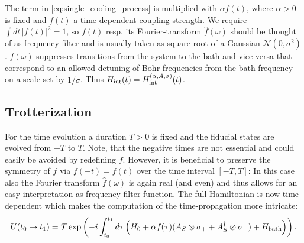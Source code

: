 \documentclass[12pt,a4paper]{article}
\begin{document}
The term in \cref{eq:single_cooling_process} is multiplied with $\alpha f(t)$, where $\alpha >0$ is fixed and $f(t)$ a time-dependent coupling strength. We require $\int dt \, |f(t)|^2  = 1$, so $f(t)$ resp. its Fourier-transform $\hat{f}(\omega)$ should be thought of as frequency filter and is usually taken as square-root of a Gaussian $\mathcal{N}(0,\sigma^2)$. $\hat{f}(\omega)$ suppresses transitions from the system to the bath and vice versa that correspond to an allowed detuning of Bohr-frequencies from the bath frequency on a scale set by $1/\sigma$. Thus $H_{\rm int}(t) =  H_{\rm int}^{(\alpha, A, \sigma)}(t)$. 

\subsection{Trotterization}
For the time evolution a duration $T>0$ is fixed and the fiducial states are evolved from $-T$ to $T$. Note, that the negative times are not essential and could easily be avoided by redefining $f$. However, it is beneficial to preserve the symmetry of $f$ via $f(-t)=f(t)$ over the time interval $[-T,T]$: In this case also the Fourier transform $\hat{f}(\omega)$ is again real (and even) and thus allows for an easy interpretation as frequency filter-function. The full Hamiltonian %
is now time dependent which makes the computation of the time-propagation more intricate:
\begin{align}\label{eq:timedependent_H}
U(t_0 \rightarrow t_1) = \mathcal{T}\exp\left(-i \int_{t_0}^{ t_1} d\tau \left(H_0 +  \alpha f(\tau)( A_S \otimes \sigma_+ +A_S^{\dagger} \otimes \sigma_- )+
H_{\rm bath}\right) \right).
\end{align}
\end{document}
